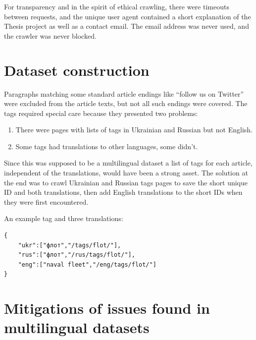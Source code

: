 For transparency and in the spirit of ethical crawling, there were timeouts between requests, and the unique user agent contained a short explanation of the Thesis project as well as a contact email. The email address was never used, and the crawler was never blocked.

\section{Dataset construction}

Paragraphs matching some standard article endings like ``follow us on Twitter'' were excluded from the article texts, but not all such endings were covered.
The tags required special care because they presented two problems:
\begin{enumerate}
    \tightlist
    \item There were pages with lists of tags in Ukrainian and Russian but not English.
    \item Some tags had translations to other languages, some didn't.
\end{enumerate}
Since this was supposed to be a multilingual dataset a list of tags for each article, independent of the translations, would have been a strong asset.
The solution at the end was to crawl Ukrainian and Russian tags pages to save the short unique ID and both translations, then add English translations to the short IDs when they were first encountered.

An example tag and three translations:
\begin{verbatim}
{
    "ukr":["флот","/tags/flot/"],
    "rus":["флот","/rus/tags/flot/"],
    "eng":["naval fleet","/eng/tags/flot/"]
}
\end{verbatim}

\section{Mitigations of issues found in multilingual datasets}


